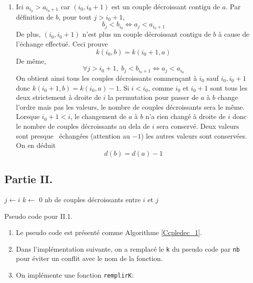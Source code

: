 \begin{enumerate}
  \item Ici $a_{i_0}>a_{i_0+1}$ car $(i_0, i_0 + 1)$ est un couple décroissant contigu de $a$. Par définition de $b$, pour tout $j>i_0+1$,
\begin{displaymath}
  b_j < b_{i_0} \Leftrightarrow a_j < a_{i_0 + 1}
\end{displaymath}
De plus, $(i_0, i_0 + 1)$ n'est plus un couple décroissant contigu de $b$ à cause de l'échange effectué. Ceci prouve
\begin{displaymath}
  k(i_0,b) = k(i_0+1 ,a)
\end{displaymath}
De même,
\begin{displaymath}
\forall j>i_0+1,\;   b_j < b_{i_0 +1} \Leftrightarrow a_j < a_{i_0}
\end{displaymath}
On obtient ainsi tous les couples décroissants commençant à $i_0$ sauf $i_0,i_0+1$ donc $k(i_0+1,b) = k(i_0 ,a) - 1$.\newline
Si $i < i_0$, comme $i_0$ et $i_0+1$ sont tous les deux strictement à droite de $i$ la permutation pour passer de $a$ à $b$ change l'ordre mais pas les valeurs, le nombre de couples décroissants sera le même. Lorsque $i_0+1<i$, le changement de $a$ à $b$ n'a rien changé à droite de $i$ donc le nombre de couples décroissants au dela de $i$ sera conservé.\newline
Deux valeurs sont \og presque\fg~ échangées (attention au $-1$) les autres valeurs sont conservées. On en déduit
\begin{displaymath}
  d(b) = d(a) - 1
\end{displaymath}


\end{enumerate}

\subsection*{Partie II.}
\begin{algorithm}
  $j\leftarrow i$\;
  $k\leftarrow$ 0 nb de couples décroissants entre $i$ et $j$\;
  \caption{Pseudo code pour II.1.}
  \label{Ccpledec_1}
\end{algorithm}
\begin{enumerate}
  \item Le pseudo code est présenté comme Algorithme \ref{Ccpledec_1}.
  \item Dans l'implémentation suivante, on a remplacé le \texttt{k} du pseudo code par \texttt{nb} pour éviter un conflit avec le nom de la fonction.

  \item On implémente une fonction \texttt{remplirK}:


\end{enumerate}

